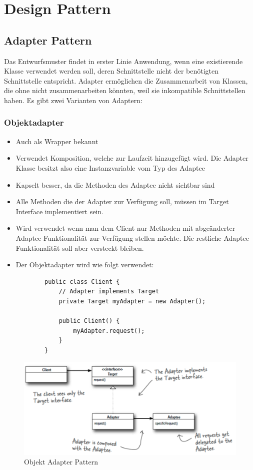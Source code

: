 \section{Design Pattern}
\subsection{Adapter Pattern}
Das Entwurfsmuster findet in erster Linie Anwendung, wenn eine existierende Klasse verwendet werden soll, deren Schnittstelle nicht der benötigten Schnittstelle entspricht. Adapter ermöglichen die Zusammenarbeit von Klassen, die ohne nicht zusammenarbeiten könnten, weil sie inkompatible Schnittstellen haben. Es gibt zwei Varianten von Adaptern:

\subsubsection{Objektadapter}
\begin{itemize}
	\item Auch als Wrapper bekannt
	\item Verwendet Komposition, welche zur Laufzeit hinzugefügt wird. Die Adapter Klasse besitzt also eine Instanzvariable vom Typ des Adaptee
	\item Kapselt besser, da die Methoden des Adaptee nicht sichtbar sind
	\item Alle Methoden die der Adapter zur Verfügung soll, müssen im Target Interface implementiert sein.
	\item Wird verwendet wenn man dem Client nur Methoden mit abgeänderter Adaptee Funktionalität zur Verfügung stellen möchte. Die restliche Adaptee Funktionalität soll aber versteckt bleiben.
	\item Der Objektadapter wird wie folgt verwendet: 
	\begin{lstlisting}
		public class Client {
			// Adapter implements Target
			private Target myAdapter = new Adapter();
			
			public Client() {
				myAdapter.request();
			}
		}
	\end{lstlisting}
\end{itemize}

\begin{figure}[h]
	\centering
	\includegraphics[width=1\linewidth]{images/object_adapter_uml}
	\caption{Objekt Adapter Pattern}
\end{figure}


